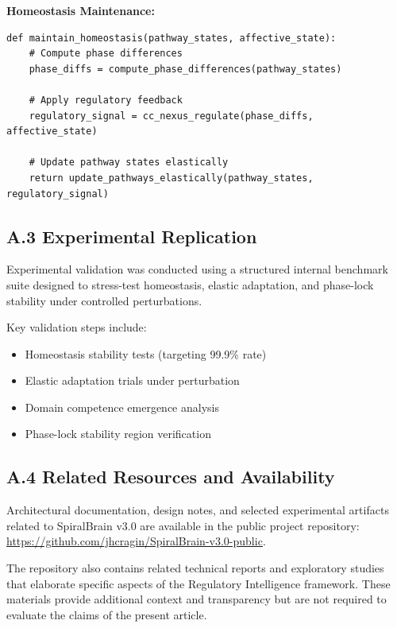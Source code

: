 \documentclass[12pt,a4paper]{report}
\begin{document}
\textbf{Homeostasis Maintenance:}
\begin{verbatim}
def maintain_homeostasis(pathway_states, affective_state):
    # Compute phase differences
    phase_diffs = compute_phase_differences(pathway_states)
    
    # Apply regulatory feedback
    regulatory_signal = cc_nexus_regulate(phase_diffs, affective_state)
    
    # Update pathway states elastically
    return update_pathways_elastically(pathway_states, regulatory_signal)
\end{verbatim}

\subsection*{A.3 Experimental Replication}

Experimental validation was conducted using a structured internal benchmark suite designed to stress-test homeostasis, elastic adaptation, and phase-lock stability under controlled perturbations.

Key validation steps include:
\begin{itemize}
    \item Homeostasis stability tests (targeting 99.9\% rate)
    \item Elastic adaptation trials under perturbation
    \item Domain competence emergence analysis
    \item Phase-lock stability region verification
\end{itemize}

\subsection*{A.4 Related Resources and Availability}

Architectural documentation, design notes, and selected experimental artifacts
related to SpiralBrain v3.0 are available in the public project repository:
\url{https://github.com/jhcragin/SpiralBrain-v3.0-public}.

The repository also contains related technical reports and exploratory studies
that elaborate specific aspects of the Regulatory Intelligence framework.
These materials provide additional context and transparency but are not required
to evaluate the claims of the present article.



\end{document}

